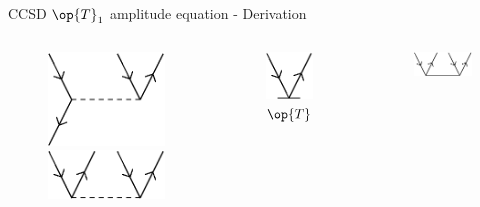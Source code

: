 \begin{frame}{CCSD $\op{T}_1$ amplitude equation - Derivation }
\begin{columns}[t]
\begin{figure}
        \parbox{0.20\textwidth}{
            \centering
            \includegraphics[scale=0.35]{graphics/v8}} 
        \parbox{0.20\textwidth}{
            \centering
            \includegraphics[scale=0.35]{graphics/v9}} 
    \end{figure}
    \begin{figure}
        \caption{$\op{T}$}
        \centering
        \parbox[height=3cm]{0.60\textwidth}{
            \centering
            \includegraphics[scale=0.45]{graphics/t1}} 
    \end{figure}
    \begin{figure}
        \parbox[height=3cm]{0.60\textwidth}{
            \centering
            \includegraphics[scale=0.45]{graphics/t2}} 
    \end{figure}
\end{columns}


\end{frame}

